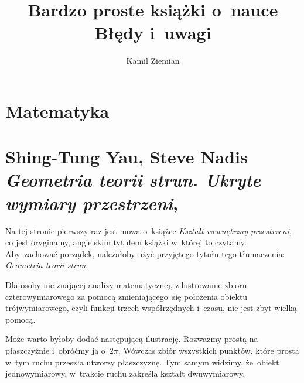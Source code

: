 \documentclass[a4paper,11pt]{article}
\title{Bardzo proste książki o~nauce \\
  {\Large Błędy i~uwagi}}
\author{Kamil Ziemian}
\numberwithin{equation}{section}
\begin{document}





\maketitle %





\section{Matematyka}



\section{ %
  Shing-Tung Yau, Steve Nadis \\
  \textit{Geometria teorii strun. Ukryte wymiary przestrzeni},
  \cite{YauNadisGeometriaTeoriiStrun2012}}

\vspace{0em}



\vspace{0em}


\noindent
{} Na tej stronie pierwszy raz jest mowa o~książce
\textit{Kształt wewnętrzny przestrzeni}, co jest oryginalny, angielskim
tytułem książki w~której to czytamy. Aby~zachować porządek, należałoby
użyć przyjętego tytułu tego tłumaczenia: \textit{Geometria teorii strun}.

\VerSpaceFour





\noindent
{} Dla osoby nie znającej analizy matematycznej,
zilustrowanie zbioru czterowymiarowego za pomocą zmieniającego~się
położenia obiektu trójwymiarowego, czyli funkcji trzech współrzędnych
i~czasu, nie jest zbyt wielką pomocą.

Może warto byłoby dodać następującą ilustrację. Rozważmy prostą na
płaszczyźnie i~obróćmy ją o~$2 \pi$. Wówczas zbiór wszystkich punktów,
które prosta w~tym ruchu przeszła utworzy płaszczyznę. Tym samym
widzimy, że~obiekt jednowymiarowy, w~trakcie ruchu zakreśla kształt
dwuwymiarowy.
\end{document}
